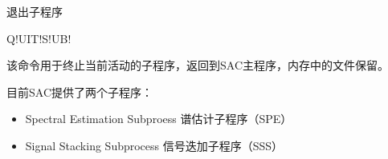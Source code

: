 \label{cmd:quitsub}

退出子程序

\begin{SACSTX}
Q!UIT!S!UB!
\end{SACSTX}

该命令用于终止当前活动的子程序，返回到SAC主程序，内存中的文件保留。

目前SAC提供了两个子程序：
\begin{itemize}
\item Spectral Estimation Subproess 谱估计子程序（SPE）
\item Signal Stacking Subprocess 信号迭加子程序（SSS）
\end{itemize}
